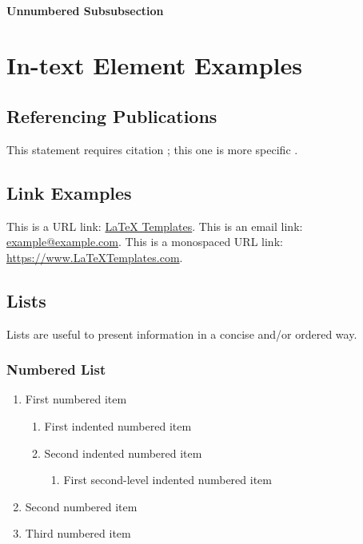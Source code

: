 \documentclass[
	11pt, %
	fleqn, %
	a4paper, %
]{LegrandOrangeBook}
\begin{document}
\subsubsection*{Unnumbered Subsubsection}


\chapter{In-text Element Examples}

\section{Referencing Publications}

This statement requires citation \cite{Smith:2022jd}; this one is more specific \cite[162]{Smith:2021qr}.


\section{Link Examples}

This is a URL link: \href{https://www.latextemplates.com}{LaTeX Templates}. This is an email link: \href{mailto:example@example.com}{example@example.com}. This is a monospaced URL link: \url{https://www.LaTeXTemplates.com}.


\section{Lists}

Lists are useful to present information in a concise and/or ordered way.

\subsection{Numbered List}

\begin{enumerate}
	\item First numbered item
	\begin{enumerate}
		\item First indented numbered item
		\item Second indented numbered item
		\begin{enumerate}
			\item First second-level indented numbered item
		\end{enumerate}
	\end{enumerate}
	\item Second numbered item
	\item Third numbered item
\end{enumerate}
\end{document}
